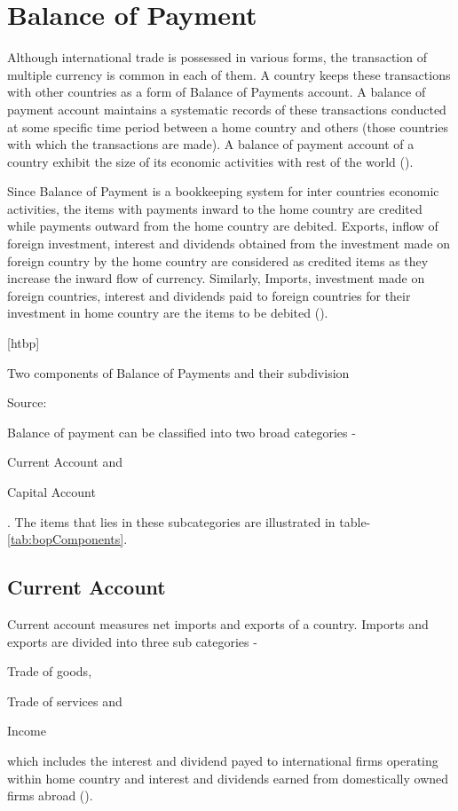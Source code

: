 \documentclass[12pt, lot, lof]{thesis}\usepackage[]{graphicx}\usepackage[]{color}
\makeatletter
\renewenvironment{table}%
  {\renewcommand{\familydefault}{\sfdefault}\selectfont
  \@float{table}}
  {\end@float}
\makeatother
\begin{document}
\section{Balance of Payment}
\label{sec:bop} 
Although international trade is possessed in various forms, the transaction of multiple currency is common in each of them. A country keeps these transactions with other countries as a form of Balance of Payments account. A balance of payment account maintains a systematic records of these transactions conducted at some specific time period between a home country and others (those countries with which the transactions are made). A balance of payment account of a country exhibit the size of its economic activities with rest of the world (\cite[p.~462]{appleyard2014international}).

Since Balance of Payment is a bookkeeping system for inter countries economic activities, the items with payments inward to the home country are credited while payments outward from the home country are debited. Exports, inflow of foreign investment, interest and dividends obtained from the investment made on foreign country by the home country are considered as credited items as they increase the inward flow of currency. Similarly, Imports, investment made on foreign countries, interest and dividends paid to foreign countries for their investment in home country are the items to be debited (\cite[p.~465]{appleyard2014international}).

\begin{table}[htbp]
\centering
\caption{Two components of Balance of Payments and their subdivision}
\label{tab:bopComponents}
    
\flushright\scriptsize{Source: \cite{madura2012international}}
\end{table}

Balance of payment can be classified into two broad categories - \begin{inlinelist}\item Current Account and \item Capital Account \end{inlinelist}. The items that lies in these subcategories are illustrated in table-\ref{tab:bopComponents}.

\subsection{Current Account}
\label{ssec:currentAccount}
Current account measures net imports and exports of a country. Imports and exports are divided into three sub categories -
\begin{inlinelist}
    \item Trade of goods, 
    \item Trade of services and 
    \item Income 
\end{inlinelist}
which includes the interest and dividend payed to international firms operating within home country and interest and dividends earned from domestically owned firms abroad (\cite{krugman2006international}).
\end{document}
